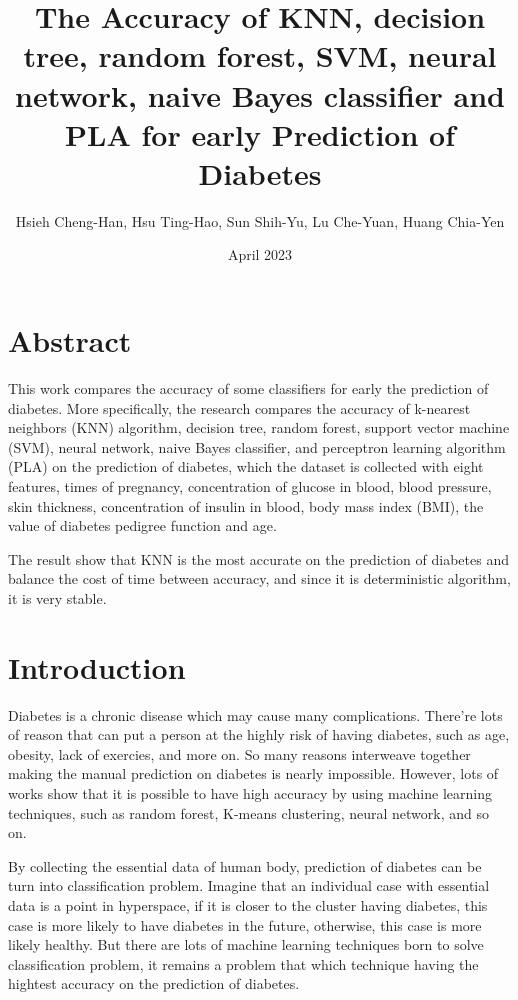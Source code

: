 \documentclass[twocolumn,10pt]{article}
\begin{document}
\title{The Accuracy of KNN, decision tree, random forest, SVM, neural network, naive Bayes classifier and PLA for early Prediction of Diabetes}

\author{Hsieh Cheng-Han, Hsu Ting-Hao, Sun Shih-Yu, Lu Che-Yuan, Huang Chia-Yen}
\date{April 2023}
\maketitle

\section*{Abstract}
  This work compares the accuracy of some classifiers for early the prediction of diabetes. More specifically, 
  the research compares the accuracy of k-nearest neighbors (KNN) algorithm, decision tree, random forest, 
  support vector machine (SVM), neural network, naive Bayes classifier, and perceptron learning algorithm (PLA) on the prediction of diabetes, which 
  the dataset is collected with eight features, times of pregnancy, concentration of glucose in blood, blood 
  pressure, skin thickness,  concentration of insulin in blood, body mass index (BMI), the value of diabetes 
  pedigree function and age.

  The result show that KNN is the most accurate on the prediction of diabetes and balance the cost of time between accuracy, and since
  it is deterministic algorithm, it is very stable.

\section{Introduction}
\label{sec:Introduction}
  Diabetes is a chronic disease which may cause many complications. There're lots of reason that can put a person 
  at the highly risk of having diabetes, such as age, obesity, lack of exercies, and more on. So many reasons 
  interweave together making the manual prediction on diabetes is nearly impossible. However, lots of works \cite{MUJUMDAR2019292} \cite{MAHBOOBALAM2019100204} \cite{10.3389/fgene.2018.00515}
  show that it is possible to have high accuracy by using machine learning techniques, such as random forest, 
  K-means clustering, neural network, and so on. 

  By collecting the essential data of human body, prediction of diabetes can be turn into classification problem. 
  Imagine that an individual case with essential data is a point in hyperspace, if it is closer to the cluster
  having diabetes, this case is more likely to have diabetes in the future, otherwise, this case is more likely 
  healthy. But there are lots of machine learning techniques born to solve classification problem, it remains a 
  problem that which technique having the hightest accuracy on the prediction of diabetes. 
\end{document}
